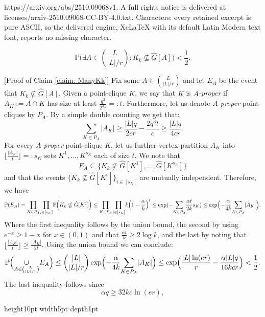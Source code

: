 \documentclass[10pt,a4paper]{amsart}
\newenvironment{proof}{{\bf Proof.}}{\hfill{ }\vrule height10pt width5pt depth1pt}
\begin{document}
https://arxiv.org/abs/2510.09068v1. A full rights notice is delivered at licenses/arxiv-2510.09068-CC-BY-4.0.txt. Characters: every retained excerpt is pure ASCII, so the delivered engine, XeLaTeX with its default Latin Modern text font, reports no missing character.
		\begin{claim}\label{claim: ManyKk}
			\begin{equation}
				\mathbb{P}\Biggl( \exists A \in \binom{L}{|L|/r}: K_k \nsubseteq\hat{G}[A] \Biggr) < \frac{1}{2}.
			\end{equation}
		\end{claim}

		\begin{proof}[Proof of Claim \ref{claim: ManyKk}]
			Fix some $A \in \binom{L}{|L|/r}$ and let $E_A$ be the event that $K_k \nsubseteq\hat{G}[A]$. Given a point-clique $K$, we say that $K$ is $A$\textit{-proper} if 
			$A_K:= A\cap K$ has size at least $\frac{q^2}{2^4r}=:t$. Furthermore, let us denote $A$\textit{-proper} point-cliques by $P_A$. By a simple double counting we get that:
			\begin{equation}
				\underset{K \in P_A}{\sum}|A_K| \geq \frac{|L|q}{2cr}- \frac{2q^3 t}{c}\geq \frac{|L|q}{4cr}.
			\end{equation}
			For every $A$\textit{-proper} point-clique $K$, let us further vertex partition $A_K$ into $\lfloor \frac{|A_K|}{t}\rfloor=:s_K$ sets $K^1,\dots,K^{s_K}$ each of size $t$. We note that 
			\[E_A\subseteq\{K_k \nsubseteq \hat{G}[K^1],\dots,\hat{G}[K^{s_K}]\} \]
			and that the events $\{K_k\nsubseteq \hat{G}[K^i]\}_{i \in [s_K]}$ are mutually independent. Therefore, we have
			\begin{equation*}
				\mathbb{P}( E_A) = \underset{K \in P_A}{\prod}\underset{j \in [s_K]}{\prod}\mathbb{P}\Bigl(K_k\nsubseteq\hat{G}[K^j]\Bigr) \leq  \underset{K \in P_A}{\prod}\underset{j \in [s_K]}{\prod}k\Bigl(1-\frac{\alpha}{k}\Bigr)^t \leq \exp(-\underset{K \in P_A}\sum\frac{\alpha t}{2k} s_K) \leq \exp\Bigl(-\frac{\alpha }{4k}\underset{K \in P_A}\sum|A_K|\Bigr).
			\end{equation*}
			Where the first inequality follows by the union bound, the second by using $e^{-x}\geq 1-x$ for $x \in (0,1)$ and that $\frac{\alpha t}{k}\geq 2 \log k$, and the last by noting that $\lfloor \frac{|A_K|}{t}\rfloor \geq \frac{|A_K|}{2t}$.
			Using the union bound we can conclude:
			\begin{equation*}
				\mathbb{P}\Bigl( \underset{A \in \binom{L}{|L|/r}}{ \cup}E_A\Bigr)\leq \binom{|L|}{|L|/r} \exp \Bigl( -\frac{\alpha}{4k} \underset{K \in P_A}{\sum}|A_K| \Bigr) \leq \exp \Bigl( \frac{|L| \ln (er)}{r}-\frac{\alpha |L|q}{16kcr}\Bigr) < \frac{1}{2}.
			\end{equation*}
			The last inequality follows since 
            \begin{equation}\label{eq: techKk}
                \alpha q \geq 32kc\ln(er),
            \end{equation}
            

\end{proof}
\end{document}
